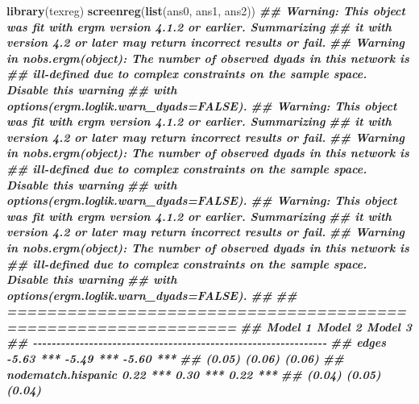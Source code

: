 \documentclass[
]{book}
\newenvironment{Shaded}{\begin{snugshade}}{\end{snugshade}}
\newcommand{\DocumentationTok}[1]{\textcolor[rgb]{0.56,0.35,0.01}{\textbf{\textit{#1}}}}
\newcommand{\FunctionTok}[1]{\textcolor[rgb]{0.13,0.29,0.53}{\textbf{#1}}}
\newcommand{\NormalTok}[1]{#1}
\begin{document}
\begin{Shaded}
\begin{Highlighting}[]
\FunctionTok{library}\NormalTok{(texreg)}
\FunctionTok{screenreg}\NormalTok{(}\FunctionTok{list}\NormalTok{(ans0, ans1, ans2))}
\DocumentationTok{\#\# Warning: This object was fit with \textquotesingle{}ergm\textquotesingle{} version 4.1.2 or earlier. Summarizing}
\DocumentationTok{\#\# it with version 4.2 or later may return incorrect results or fail.}
\DocumentationTok{\#\# Warning in nobs.ergm(object): The number of observed dyads in this network is}
\DocumentationTok{\#\# ill{-}defined due to complex constraints on the sample space. Disable this warning}
\DocumentationTok{\#\# with \textquotesingle{}options(ergm.loglik.warn\_dyads=FALSE)\textquotesingle{}.}
\DocumentationTok{\#\# Warning: This object was fit with \textquotesingle{}ergm\textquotesingle{} version 4.1.2 or earlier. Summarizing}
\DocumentationTok{\#\# it with version 4.2 or later may return incorrect results or fail.}
\DocumentationTok{\#\# Warning in nobs.ergm(object): The number of observed dyads in this network is}
\DocumentationTok{\#\# ill{-}defined due to complex constraints on the sample space. Disable this warning}
\DocumentationTok{\#\# with \textquotesingle{}options(ergm.loglik.warn\_dyads=FALSE)\textquotesingle{}.}
\DocumentationTok{\#\# Warning: This object was fit with \textquotesingle{}ergm\textquotesingle{} version 4.1.2 or earlier. Summarizing}
\DocumentationTok{\#\# it with version 4.2 or later may return incorrect results or fail.}
\DocumentationTok{\#\# Warning in nobs.ergm(object): The number of observed dyads in this network is}
\DocumentationTok{\#\# ill{-}defined due to complex constraints on the sample space. Disable this warning}
\DocumentationTok{\#\# with \textquotesingle{}options(ergm.loglik.warn\_dyads=FALSE)\textquotesingle{}.}
\DocumentationTok{\#\# }
\DocumentationTok{\#\# ===============================================================}
\DocumentationTok{\#\#                     Model 1        Model 2        Model 3      }
\DocumentationTok{\#\# {-}{-}{-}{-}{-}{-}{-}{-}{-}{-}{-}{-}{-}{-}{-}{-}{-}{-}{-}{-}{-}{-}{-}{-}{-}{-}{-}{-}{-}{-}{-}{-}{-}{-}{-}{-}{-}{-}{-}{-}{-}{-}{-}{-}{-}{-}{-}{-}{-}{-}{-}{-}{-}{-}{-}{-}{-}{-}{-}{-}{-}{-}{-}}
\DocumentationTok{\#\# edges                   {-}5.63 ***      {-}5.49 ***      {-}5.60 ***}
\DocumentationTok{\#\#                         (0.05)         (0.06)         (0.06)   }
\DocumentationTok{\#\# nodematch.hispanic       0.22 ***       0.30 ***       0.22 ***}
\DocumentationTok{\#\#                         (0.04)         (0.05)         (0.04)   }

\end{Highlighting}
\end{Shaded}
\end{document}
